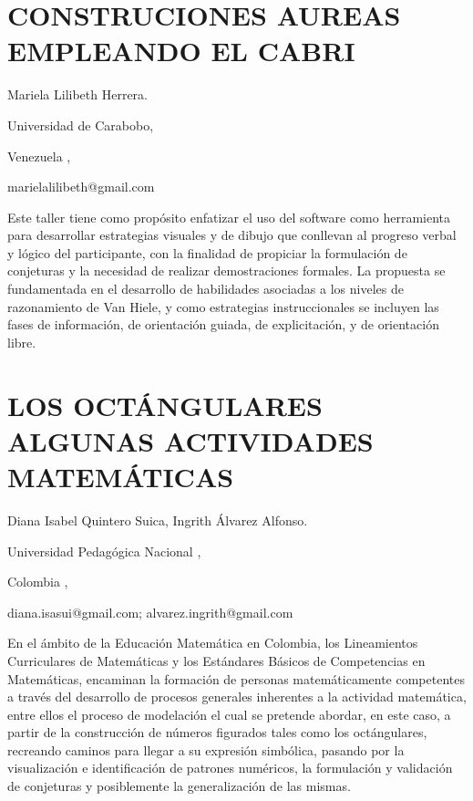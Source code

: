 \section{CONSTRUCIONES AUREAS EMPLEANDO EL CABRI}

\begin{datos}

Mariela Lilibeth Herrera.

Universidad de Carabobo,

Venezuela ,

marielalilibeth@gmail.com

\end{datos}

Este taller tiene como propósito enfatizar el uso del software como
herramienta para desarrollar estrategias visuales y de dibujo que
conllevan al progreso verbal y lógico del participante, con la finalidad
de propiciar la formulación de conjeturas y la necesidad de realizar
demostraciones formales. La propuesta se fundamentada en el desarrollo
de habilidades asociadas a los niveles de razonamiento de Van Hiele,
y como estrategias instruccionales se incluyen las fases de información,
de orientación guiada, de explicitación, y de orientación libre.


\section{LOS OCTÁNGULARES ALGUNAS ACTIVIDADES MATEMÁTICAS}

\begin{datos}

Diana Isabel Quintero Suica, Ingrith Álvarez Alfonso.

Universidad Pedagógica Nacional ,

Colombia ,

diana.isasui@gmail.com; alvarez.ingrith@gmail.com

\end{datos}

En el ámbito de la Educación Matemática en Colombia, los Lineamientos
Curriculares de Matemáticas y los Estándares Básicos de Competencias
en Matemáticas, encaminan la formación de personas matemáticamente
competentes a través del desarrollo de procesos generales inherentes
a la actividad matemática, entre ellos el proceso de modelación el
cual se pretende abordar, en este caso, a partir de la construcción
de números figurados tales como los octángulares, recreando caminos
para llegar a su expresión simbólica, pasando por la visualización
e identificación de patrones numéricos, la formulación y validación
de conjeturas y posiblemente la generalización de las mismas. 


